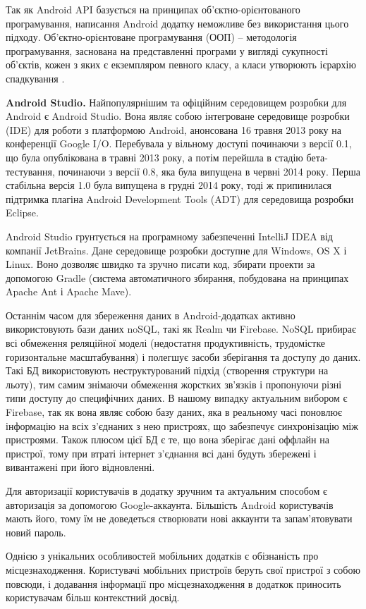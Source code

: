 \documentclass[../main.tex]{subfiles}
\begin{document}
Так як Android API базується на принципах об'єктно-орієнтованого програмування, написання Android додатку неможливе без використання цього підходу. Об'єктно-орієнтоване програмування (ООП) -- методологія програмування, заснована на представленні програми у вигляді сукупності об'єктів, кожен з яких є екземпляром певного класу, а класи утворюють ієрархію спадкування \cite{oop}.

\textbf{Android Studio.}
Найпопулярнішим та офіційним середовищем розробки для Android є Android Studio. Вона являє собою інтегроване середовище розробки (IDE) для роботи з платформою Android, анонсована 16 травня 2013 року на конференції Google I/O. Перебувала у вільному доступі починаючи з версії 0.1, що була опублікована в травні 2013 року, а потім перейшла в стадію бета-тестування, починаючи з версії 0.8, яка була випущена в червні 2014 року. Перша стабільна версія 1.0 була випущена в грудні 2014 року, тоді ж припинилася підтримка плагіна Android Development Tools (ADT) для середовища розробки Eclipse.

Android Studio грунтується на програмному забезпеченні IntelliJ IDEA від компанії JetBrains. Дане середовище розробки доступне для Windows, OS X і Linux. Воно дозволяє швидко та зручно писати код, збирати проекти за допомогою Gradle (система автоматичного збирання, побудована на принципах Apache Ant і Apache Mave).

Останнім часом для збереження даних в Android-додатках активно використовують бази даних noSQL, такі як Realm чи Firebase. NoSQL прибирає всі обмеження реляційної моделі (недостатня продуктивність, трудомістке горизонтальне масштабування) і полегшує засоби зберігання та доступу до даних. Такі БД використовують неструктурований підхід (створення структури на льоту), тим самим знімаючи обмеження жорстких зв'язків і пропонуючи різні типи доступу до специфічних даних. В нашому випадку актуальним вибором є Firebase, так як вона являє собою базу даних, яка в реальному часі поновлює інформацію на всіх з'єднаних з нею пристроях, що забезпечує синхронізацію між пристроями. Також плюсом цієї БД є те, що вона зберігає дані оффлайн на пристрої, тому при втраті інтернет з'єднання всі дані будуть збережені і вивантажені при його відновленні.

Для авторизації користувачів в додатку зручним та актуальним способом є авторизація за допомогою Google-аккаунта. Більшість Android користувачів мають його, тому їм не доведеться створювати нові аккаунти та запам'ятовувати новий пароль.

Однією з унікальних особливостей мобільних додатків є обізнаність про місцезнаходження. Користувачі мобільних пристроїв беруть свої пристрої з собою повсюди, і додавання інформації про місцезнаходження в додаткок приносить користувачам більш контекстний досвід. 
\end{document}
